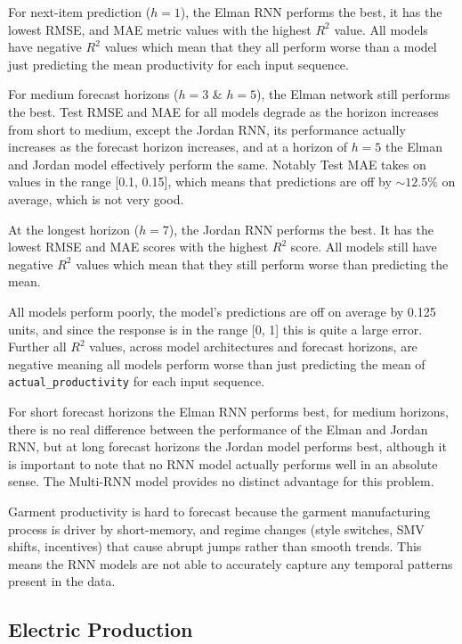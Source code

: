 \documentclass[conference]{IEEEtran}
\begin{document}
For next-item prediction ($h=1$), the Elman RNN performs the best, it has the lowest RMSE, and MAE metric values with the highest $R^2$ value. All models have negative $R^2$ values which mean that they all perform worse than a model just predicting the mean productivity for each input sequence.

For medium forecast horizons ($h=3$ \& $h=5$), the Elman network still performs the best. Test RMSE and MAE for all models degrade as the horizon increases from short to medium, except the Jordan RNN, its performance actually increases as the forecast horizon increases, and at a horizon of $h=5$ the Elman and Jordan model effectively perform the same. Notably Test MAE takes on values in the range [0.1, 0.15], which means that predictions are off by $\sim 12.5\%$ on average, which is not very good.

At the longest horizon ($h=7$), the Jordan RNN performs the best. It has the lowest RMSE and MAE scores with the highest $R^2$ score. All models still have negative $R^2$ values which mean that they still perform worse than predicting the mean.

All models perform poorly, the model's predictions are off on average by 0.125 units, and since the response is in the range [0, 1] this is quite a large error. Further all $R^2$ values, across model architectures and forecast horizons, are negative meaning all models perform worse than just predicting the mean of \texttt{actual\_productivity} for each input sequence.

For short forecast horizons the Elman RNN performs best, for medium horizons, there is no real difference between the performance of the Elman and Jordan RNN, but at long forecast horizons the Jordan model performs best, although it is important to note that no RNN model actually performs well in an absolute sense. The Multi-RNN model provides no distinct advantage for this problem.

Garment productivity is hard to forecast because the garment manufacturing process is driver by short-memory, and regime changes (style switches, SMV shifts, incentives) that cause abrupt jumps rather than smooth trends. This means the RNN models are not able to accurately capture any temporal patterns present in the data.

\subsection{\textbf{Electric Production}}
\end{document}
